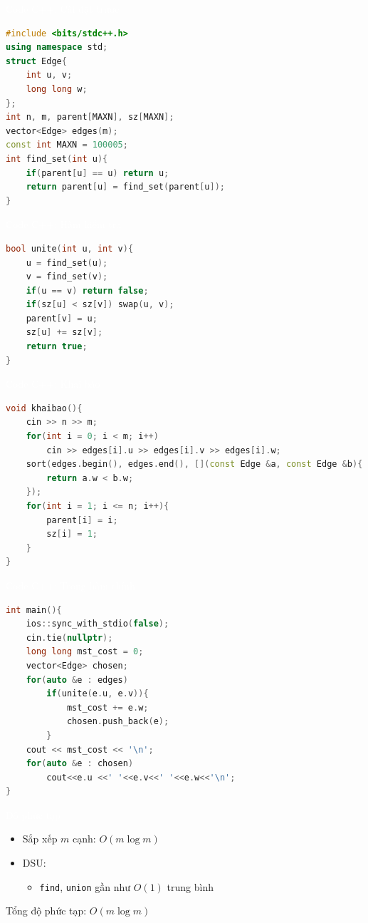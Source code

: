 \documentclass{beamer}
\newcommand{\hlred}[1]{\textcolor{myred}{#1}}
\newcommand{\hlwhite}[1]{\textcolor{white}{#1}}
\begin{document}

\begin{frame}[fragile]{\hlwhite{Code C++: Cài đặt trước}}
\begin{lstlisting}[language=C++]
#include <bits/stdc++.h>
using namespace std;
struct Edge{
    int u, v;
    long long w;
};
int n, m, parent[MAXN], sz[MAXN];
vector<Edge> edges(m);
const int MAXN = 100005;
int find_set(int u){
    if(parent[u] == u) return u;
    return parent[u] = find_set(parent[u]);
}
\end{lstlisting}
\end{frame}

\begin{frame}[fragile]{\hlwhite{Code C++: Hàm kiểm tra}}
\begin{lstlisting}[language=C++]
bool unite(int u, int v){
    u = find_set(u);
    v = find_set(v);
    if(u == v) return false;
    if(sz[u] < sz[v]) swap(u, v);
    parent[v] = u;
    sz[u] += sz[v];
    return true;
}
\end{lstlisting}
\end{frame}

\begin{frame}[fragile]{\hlwhite{Code C++: Khai báo}}
\begin{lstlisting}[language=C++]
void khaibao(){
    cin >> n >> m;
    for(int i = 0; i < m; i++)
        cin >> edges[i].u >> edges[i].v >> edges[i].w;
    sort(edges.begin(), edges.end(), [](const Edge &a, const Edge &b){
        return a.w < b.w;
    });
    for(int i = 1; i <= n; i++){
        parent[i] = i;
        sz[i] = 1;
    }
}
\end{lstlisting}
\end{frame}
\begin{frame}[fragile]{\hlwhite{Code C++: Trong hàm chính}}
\begin{lstlisting}[language=C++]
int main(){
    ios::sync_with_stdio(false);
    cin.tie(nullptr);
    long long mst_cost = 0;
    vector<Edge> chosen;
    for(auto &e : edges)
        if(unite(e.u, e.v)){
            mst_cost += e.w;
            chosen.push_back(e);
        }
    cout << mst_cost << '\n';
    for(auto &e : chosen)
        cout<<e.u <<' '<<e.v<<' '<<e.w<<'\n';
}
\end{lstlisting}
\end{frame}


\begin{frame}{\hlwhite{Độ phức tạp}}
\begin{itemize}
\item Sắp xếp $m$ cạnh: $O(m \log m)$
\item DSU:
\begin{itemize}
\item \texttt{find}, \texttt{union} gần như $O(1)$ trung bình
\end{itemize}
\end{itemize}

\begin{tcolorbox}
\centering
\hlred{Tổng độ phức tạp: $O(m \log m)$}
\end{tcolorbox}
\end{frame}
\end{document}
